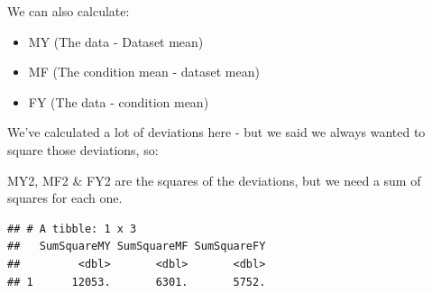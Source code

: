 \documentclass[
]{book}
\newenvironment{Shaded}{\begin{snugshade}}{\end{snugshade}}
\newcommand{\DataTypeTok}[1]{\textcolor[rgb]{0.13,0.29,0.53}{#1}}
\newcommand{\KeywordTok}[1]{\textcolor[rgb]{0.13,0.29,0.53}{\textbf{#1}}}
\newcommand{\NormalTok}[1]{#1}
\newcommand{\OperatorTok}[1]{\textcolor[rgb]{0.81,0.36,0.00}{\textbf{#1}}}
\newcommand{\StringTok}[1]{\textcolor[rgb]{0.31,0.60,0.02}{#1}}
\begin{document}
We can also calculate:

\begin{itemize}
\item
  MY (The data - Dataset mean)
\item
  MF (The condition mean - dataset mean)
\item
  FY (The data - condition mean)
\end{itemize}

\begin{Shaded}
\end{Shaded}

We've calculated a lot of deviations here - but we said we always wanted to square those deviations, so:

\begin{Shaded}
\end{Shaded}

MY2, MF2 \& FY2 are the squares of the deviations, but we need a sum of squares for each one.

\begin{Shaded}
\end{Shaded}

\begin{verbatim}
## # A tibble: 1 x 3
##   SumSquareMY SumSquareMF SumSquareFY
##         <dbl>       <dbl>       <dbl>
## 1      12053.       6301.       5752.
\end{verbatim}
\end{document}

